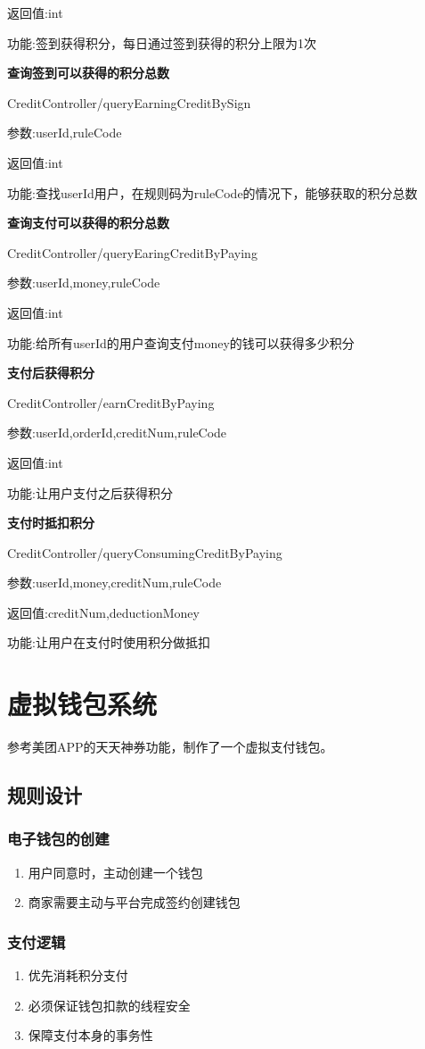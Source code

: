 返回值:int

功能:签到获得积分，每日通过签到获得的积分上限为1次

\textbf{查询签到可以获得的积分总数}

CreditController/queryEarningCreditBySign

参数:userId,ruleCode

返回值:int

功能:查找userId用户，在规则码为ruleCode的情况下，能够获取的积分总数

\textbf{查询支付可以获得的积分总数}

CreditController/queryEaringCreditByPaying

参数:userId,money,ruleCode

返回值:int

功能:给所有userId的用户查询支付money的钱可以获得多少积分

\textbf{支付后获得积分}

CreditController/earnCreditByPaying

参数:userId,orderId,creditNum,ruleCode

返回值:int

功能:让用户支付之后获得积分

\textbf{支付时抵扣积分}

CreditController/queryConsumingCreditByPaying

参数:userId,money,creditNum,ruleCode

返回值:creditNum,deductionMoney

功能:让用户在支付时使用积分做抵扣

\section{虚拟钱包系统}
参考美团APP的天天神券功能，制作了一个虚拟支付钱包。

\subsection{规则设计}
\subsubsection{电子钱包的创建}
\begin{enumerate}
	\item 用户同意时，主动创建一个钱包
	\item 商家需要主动与平台完成签约创建钱包
\end{enumerate}

\subsubsection{支付逻辑}
\begin{enumerate}
	\item 优先消耗积分支付
	\item 必须保证钱包扣款的线程安全
	\item 保障支付本身的事务性
\end{enumerate}


